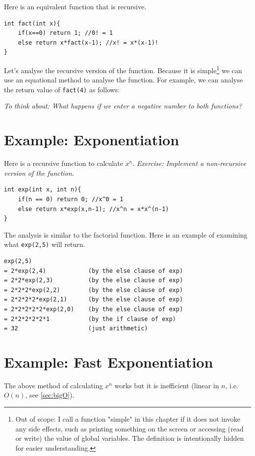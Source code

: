Here is an equivalent function that is recursive.

\begin{lstlisting}
int fact(int x){
    if(x==0) return 1; //0! = 1
    else return x*fact(x-1); //x! = x*(x-1)!
}
\end{lstlisting}

Let's analyse the recursive version of the function. Because it is simple\footnote{Out of scope: I call a function "simple" in this chapter if it does not invoke any side effects, such as printing something on the screen or accessing (read or write) the value of global variables. The definition is intentionally hidden for easier understanding.} we can use an equational method to analyse the function. For example, we can analyse the return value of \texttt{fact(4)} as follows:

\textit{To think about: What happens if we enter a negative number to both functions?}

\section{Example: Exponentiation}

Here is a recursive function to calculate $x^n$. \textit{Exercise: Implement a non-recursive version of the function.}

\begin{lstlisting}
int exp(int x, int n){
    if(n == 0) return 0; //x^0 = 1
    else return x*exp(x,n-1); //x^n = x*x^(n-1)
}
\end{lstlisting}

The analysis is similar to the factorial function. Here is an example of examining what \texttt{exp(2,5)} will return.

\begin{lstlisting}
exp(2,5)
= 2*exp(2,4)            (by the else clause of exp)
= 2*2*exp(2,3)          (by the else clause of exp)
= 2*2*2*exp(2,2)        (by the else clause of exp)
= 2*2*2*2*exp(2,1)      (by the else clause of exp)
= 2*2*2*2*2*exp(2,0)    (by the else clause of exp)
= 2*2*2*2*2*1           (by the if clause of exp)
= 32                    (just arithmetic)
\end{lstlisting}

\section{Example: Fast Exponentiation}

The above method of calculating $x^n$ works but it is inefficient (linear in $n$, i.e. $O(n)$, see \cref{sec:bigO}). 

